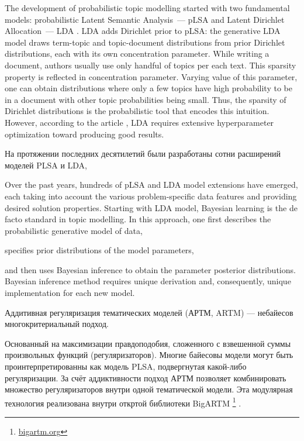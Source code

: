 The development of probabilistic topic modelling started with two fundamental models: probabilistic Latent Semantic Analysis~--- pLSA \cite{hofmann1999probabilistic} and Latent Dirichlet Allocation~--- LDA \cite{blei2003latent}. LDA adds Dirichlet prior to pLSA: the generative LDA model draws term-topic and topic-document distributions from prior Dirichlet distributions, each with its own concentration parameter. While writing a document, authors usually use only handful of topics per each text. This sparsity property is reflected in concentration parameter. Varying value of this parameter, one can obtain distributions where only a few topics have high probability to be in a document with other topic probabilities being small. Thus, the sparsity of Dirichlet distributions is the probabilistic tool that encodes this intuition. However, according to the article \cite{wallach2009rethinking}, LDA requires extensive hyperparameter optimization toward producing good results.

На протяжении последних десятилетий были разработаны сотни расширений моделей PLSA и LDA, 

Over the past years, hundreds of pLSA and LDA model extensions have emerged, each taking into account the various problem-specific data features and providing  desired solution properties. Starting with LDA model, Bayesian learning is the de facto standard in topic modelling. In this approach, one first describes the probabilistic generative model of data,

specifies prior distributions of the model parameters,

and then uses Bayesian inference to obtain the parameter posterior distributions. Bayesian inference method requires unique derivation and, consequently, unique implementation for each new model. 


Аддитивная регуляризация тематических моделей (АРТМ, ARTM) \cite{voron14dan-eng,kochedykov2017fast} --- небайесов многокритериальный подход. 

Основанный на максимизации правдоподобия, сложенного с взвешенной суммы произвольных функций (регуляризаторов). Многие байесовы модели могут быть проинтерпретированны как модель PLSA, подвергнутая какой-либо регуляризации. За счёт аддиктивности подход АРТМ позволяет комбинировать множество регуляризаторов внутри одной тематической модели. Эта модулярная технология реализована внутри откртой библиотеки BigARTM \footnote{\url{bigartm.org}} 
\cite{voron15aist}. 

